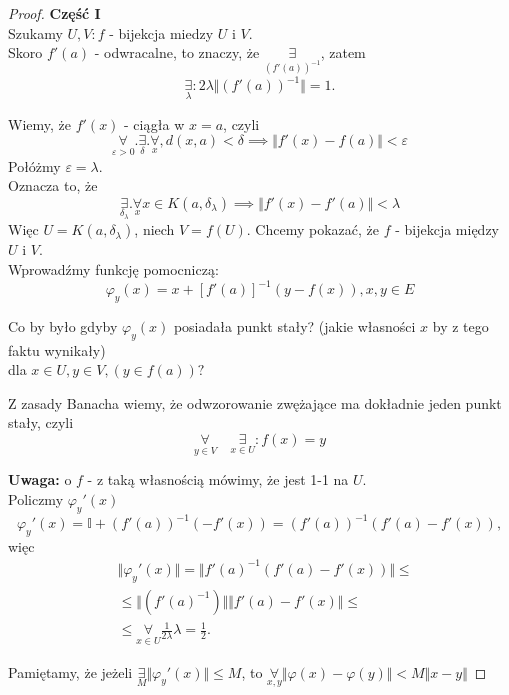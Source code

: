 \documentclass[../main.tex]{subfiles}
\begin{document}
\begin{proof}
    \textbf{Część I}\\
Szukamy $U,V: f$ - bijekcja miedzy $U$ i $V$.\\
Skoro $f'(a)$ - odwracalne, to znaczy, że $\underset{(f'(a))^{-1}}{\exists}$, zatem
    \[
        \underset{\lambda}{\exists}: 2\lambda \Vert (f'(a))^{-1} \Vert = 1.
    \]

Wiemy, że $f'(x)$ - ciągła w $x=a$, czyli
    \[
    \underset{\varepsilon>0}{\forall}.\underset{\delta}{\exists}.\underset{x}{\forall},d(x,a)<\delta \implies \Vert f'(x) - f(a) \Vert < \varepsilon
\]
Połóżmy $\varepsilon = \lambda$.\\
Oznacza to, że
    \[
\underset{\delta_\lambda}{\exists}.\underset{x}{\forall}x\in K(a,\delta_\lambda) \implies \Vert f'(x) - f'(a) \Vert < \lambda
\]
Więc $U = K(a,\delta_\lambda)$, niech $V = f(U)$. Chcemy pokazać, że $f$ - bijekcja między $U$ i $V$.\\

Wprowadźmy funkcję pomocniczą:
    \[
\varphi_y(x) = x+[f'(a)]^{-1} (y-f(x)), x,y\in E
\]

\begin{pytanie}
    Co by było gdyby $\varphi_y(x)$ posiadała punkt stały? (jakie własności $x$ by z tego faktu wynikały)\\
dla $x\in U, y\in V, (y\in f(a))?$
\end{pytanie}

Z zasady Banacha wiemy, że odwzorowanie zwężające ma dokładnie jeden punkt stały, czyli
    \[
        \underset{y\in V}{\forall}\quad \underset{x\in U}{\exists}: f(x) = y
    \]

\textbf{Uwaga: } o $f$ - z taką własnością mówimy, że jest 1-1 na $U$.\\
    Policzmy $\varphi_y'(x)$
    \[
    \varphi_y '(x) = \mathbb{I} + (f'(a))^{-1} (-f'(x)) = (f'(a))^{-1}(f'(a) - f'(x)),
\]
    więc
    \begin{align*}
        &\Vert \varphi_y '(x) \Vert = \Vert f'(a)^{-1} (f'(a) - f'(x))\Vert \leq\\
        &\leq \Vert (f'(a)^{-1})\Vert \Vert f'(a) - f'(x) \Vert \leq\\
        &\leq \underset{x\in U}{\forall}\frac{1}{2\lambda} \lambda = \frac{1}{2}
    .\end{align*}

Pamiętamy, że jeżeli $\underset{M}{\exists}\Vert\varphi_y '(x)\Vert \leq M$, to $\underset{x,y}{\forall}\Vert \varphi(x) - \varphi(y)\Vert < M\Vert x-y \Vert$


\end{proof}
\end{document}
